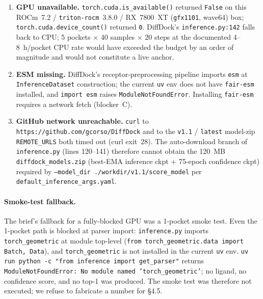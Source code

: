 \begin{enumerate}
  \item \textbf{GPU unavailable.}
        \texttt{torch.cuda.is\_available()} returned \texttt{False}
        on this ROCm~7.2 / \texttt{triton-rocm}~3.8.0 / RX~7800~XT
        (\texttt{gfx1101}, wave64) box; \texttt{torch.cuda.device\_count()}
        returned \texttt{0}. DiffDock's \texttt{inference.py:142}
        falls back to CPU; 5 pockets $\times$ 40 samples $\times$ 20
        steps at the documented 4--8~h/pocket CPU rate would have
        exceeded the budget by an order of magnitude and would not
        constitute a live anchor.
  \item \textbf{ESM missing.}
        DiffDock's receptor-preprocessing pipeline imports
        \texttt{esm} at \texttt{InferenceDataset} construction; the
        current \texttt{uv} env does not have \texttt{fair-esm}
        installed, and \texttt{import esm} raises
        \texttt{ModuleNotFoundError}. Installing \texttt{fair-esm}
        requires a network fetch (blocker~C).
  \item \textbf{GitHub network unreachable.}
        \texttt{curl} to \texttt{https://github.com/gcorso/DiffDock}
        and to the \texttt{v1.1} / \texttt{latest} model-zip
        \texttt{REMOTE\_URLS} both timed out (curl exit~28). The
        auto-download branch of \texttt{inference.py} (lines
        120--141) therefore cannot obtain the 120~MB
        \texttt{diffdock\_models.zip} (best-EMA inference ckpt
        + 75-epoch confidence ckpt) required by
        \texttt{--model\_dir ./workdir/v1.1/score\_model} per
        \texttt{default\_inference\_args.yaml}.
\end{enumerate}

\paragraph{Smoke-test fallback.}
The brief's fallback for a fully-blocked GPU was a 1-pocket
smoke test. Even the 1-pocket path is blocked at parser import:
\texttt{inference.py} imports \texttt{torch\_geometric} at module
top-level (\texttt{from torch\_geometric.data import Batch, Data}),
and \texttt{torch\_geometric} is not installed in the current
\texttt{uv} env. \texttt{uv run python -c "from inference import
get\_parser"} returns \texttt{ModuleNotFoundError: No module
named 'torch\_geometric'}; no ligand, no confidence score, and no
top-1 was produced. The smoke test was therefore not executed; we
refuse to fabricate a number for §4.5.

